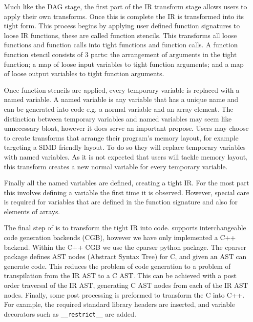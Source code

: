 Much like the DAG stage, the first part of the IR transform stage allows users to apply their own transforms.
Once this is complete the IR is transformed into its tight form.
This process begins by applying user defined function signatures to loose IR functions, these are called function stencils.
This transforms all loose functions and function calls into tight functions and function calls.
A function function stencil consists of 3 parts: the arrangement of arguments in the tight function; a map of loose input variables to tight function arguments; and a map of loose output variables to tight function arguments.

Once function stencils are applied, every temporary variable is replaced with a named variable.
A named variable is any variable that has a unique name and can be generated into code e.g. a normal variable and an array element.
The distinction between temporary variables and named variables may seem like unnecessary bloat, however it does serve an important propose.
Users may choose to create transforms that arrange their program's memory layout, for example targeting a SIMD friendly layout.
To do so they will replace temporary variables with named variables.
As it is not expected that users will tackle memory layout, this transform creates a new normal variable for every temporary variable.

Finally all the named variables are defined, creating a tight IR.
For the most part this involves defining a variable the first time it is observed.
However, special care is required for variables that are defined in the function signature and also for elements of arrays.

The final step of \phlat is to transform the tight IR into code.
\phlat supports interchangeable code generation backends (CGB), however we have only implemented a C++ backend.
Within the C++ CGB we use the cparser python package.
The cparser package defines AST nodes (Abstract Syntax Tree) for C, and given an AST can generate code.
This reduces the problem of code generation to a problem of transpilation from the IR AST to a C AST.
This can be achieved with a post order traversal of the IR AST, generating C AST nodes from each of the IR AST nodes.
Finally, some post processing is preformed to transform the C into C++.
For example, the required standard library headers are inserted, and variable decorators such as \lstinline{__restrict__} are added.  


